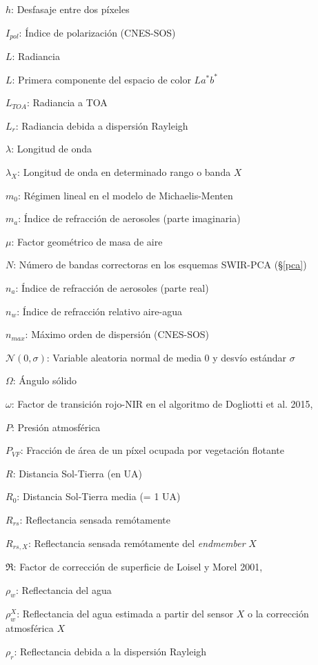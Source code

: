 {$h$: Desfasaje entre dos píxeles

$I_{pol}$: Índice de polarización (CNES-SOS)

$L$: Radiancia

$L$: Primera componente del espacio de color $La^{*}b^{*}$

$L_{TOA}$: Radiancia a TOA

$L_{r}$: Radiancia debida a dispersión Rayleigh

$\lambda$: Longitud de onda

$\lambda_{X}$: Longitud de onda en determinado rango o banda $X$

$m_{0}$: Régimen lineal en el modelo de Michaelis-Menten

$m_{a}$: Índice de refracción de aerosoles (parte imaginaria)

$\mu$: Factor geométrico de masa de aire

$N$: Número de bandas correctoras en los esquemas SWIR-PCA (\S \ref{pca})

$n_{a}$: Índice de refracción de aerosoles (parte real)

$n_{w}$: Índice de refracción relativo aire-agua

$n_{max}$: Máximo orden de dispersión (CNES-SOS)

$\mathcal{N}(0,\sigma)$: Variable aleatoria normal de media 0 y desvío estándar $\sigma$

$\Omega$: Ángulo sólido

$\omega$: Factor de transición rojo-NIR en el algoritmo de Dogliotti et al. 2015, \cite{dogliotti2015}

$P$: Presión atmosférica

$P_{VF}$: Fracción de área de un píxel ocupada por vegetación flotante

$R$: Distancia Sol-Tierra (en UA)

$R_{0}$: Distancia Sol-Tierra media (= 1 UA)

$R_{rs}$: Reflectancia sensada remótamente

$R_{rs,X}$: Reflectancia sensada remótamente del \textit{endmember} $X$

$\Re$: Factor de corrección de superficie de Loisel y Morel 2001, \cite{loisel2001}

$\rho_{w}$: Reflectancia del agua

$\rho_{w}^{X}$: Reflectancia del agua estimada a partir del sensor $X$ o la corrección atmosférica $X$

$\rho_{r}$: Reflectancia debida a la dispersión Rayleigh

}
